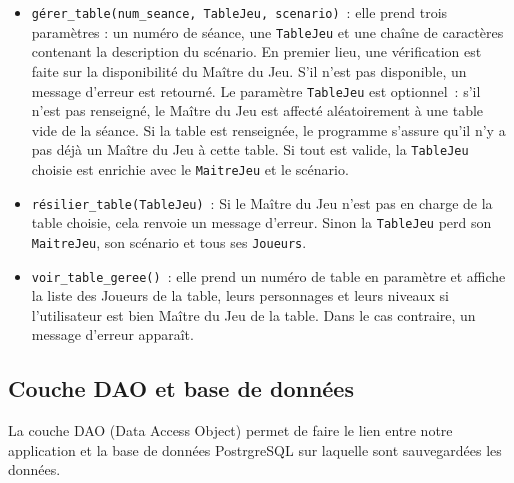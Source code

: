 \documentclass[11pt]{article}
\begin{document}
\begin{itemize}[label=, font=\small]
    \item \texttt{gérer\_table(num\_seance, TableJeu, scenario)}~: elle prend trois paramètres : un numéro de séance, une \texttt{TableJeu} et une chaîne de caractères contenant la description du scénario. En premier lieu, une vérification est faite sur la disponibilité du Maître du Jeu. S'il n'est pas disponible, un message d'erreur est retourné. Le paramètre \texttt{TableJeu} est optionnel~: s'il n'est pas renseigné, le Maître du Jeu est affecté aléatoirement à une table vide de la séance. Si la table est renseignée, le programme s'assure qu'il n'y a pas déjà un Maître du Jeu à cette table. Si tout est valide, la \texttt{TableJeu} choisie est enrichie avec le \texttt{MaitreJeu} et le scénario.
    
    \item \texttt{résilier\_table(TableJeu)}~: Si le Maître du Jeu n'est pas en charge de la table choisie, cela renvoie un message d'erreur. Sinon la \texttt{TableJeu} perd son \texttt{MaitreJeu}, son scénario et tous ses \texttt{Joueurs}.
    
    \item \texttt{voir\_table\_geree()}~: elle prend un numéro de table en paramètre et affiche la liste des Joueurs de la table, leurs personnages et leurs niveaux si l'utilisateur est bien Maître du Jeu de la table. Dans le cas contraire, un message d'erreur apparaît.
\end{itemize}





\subsection{Couche DAO et base de données}

La couche DAO (Data Access Object) permet de faire le lien entre notre application et la base de données PostrgreSQL sur laquelle sont sauvegardées les données.









\end{document}
